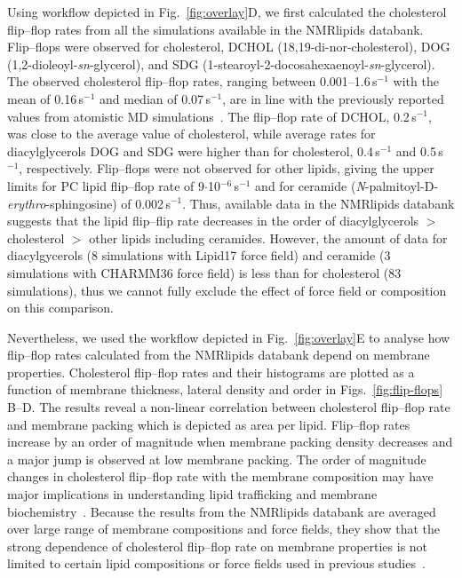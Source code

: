 \documentclass[fleqn,10pt]{wlscirep}
\begin{document}
Using workflow depicted in Fig.~\ref{fig:overlay}D, we first calculated the cholesterol flip--flop rates from all the simulations available in the NMRlipids databank. Flip--flops were observed for cholesterol, %
DCHOL (18,19-di-nor-cholesterol), %
DOG (1,2-dioleoyl-\textit{sn}-glycerol), %
and SDG (1-stearoyl-2-docosahexaenoyl-\textit{sn}-glycerol). The observed cholesterol flip--flop rates, ranging between 0.001--1.6\,\textmu{}s$^{-1}$ with the mean of 0.16\,\textmu{}s$^{-1}$ and median of 0.07\,\textmu{}s$^{-1}$, are in line with the previously reported values from atomistic MD simulations~\cite{gu19,javanainen19,baral20}. The flip--flop rate of DCHOL, 0.2\,\textmu{}s$^{-1}$, was close to the average value of cholesterol, while average rates for diacylglycerols DOG and SDG were higher than for cholesterol, 0.4\,\textmu{}s$^{-1}$ and 0.5\,\textmu{}s$^{-1}$, respectively. Flip--flops were not observed for other lipids, giving the upper limits for PC lipid flip--flop rate of 9$\cdot$10$^{-6}$\,\textmu{}s$^{-1}$ and for ceramide (\textit{N}-palmitoyl-\textsc{D}-\textit{erythro}-sphingosine) of 0.002\,\textmu{}s$^{-1}$. Thus, available data in the NMRlipids databank suggests that the lipid flip--flip rate decreases in the order of diacylglycerols $>$ cholesterol $>$ other lipids including ceramides. However, the amount of data for diacylgycerols (8 simulations with Lipid17 force field) and ceramide (3 simulations with CHARMM36 force field) is less than for cholesterol (83 simulations), thus we cannot fully exclude the effect of force field or composition on this comparison.

Nevertheless, we used the workflow depicted in Fig.~\ref{fig:overlay}E to analyse how flip--flop rates calculated from the NMRlipids databank depend on membrane properties. Cholesterol flip--flop rates and their histograms are plotted as a function of membrane thickness, lateral density and order in Figs.~\ref{fig:flip-flops} B--D. The results reveal a non-linear correlation between cholesterol flip--flop rate and membrane packing which is depicted as area per lipid. Flip--flop rates increase by an order of magnitude when membrane packing density decreases and a major jump is observed at low membrane packing. The order of magnitude changes in cholesterol flip--flop rate with the membrane composition may have major implications in understanding lipid trafficking and membrane biochemistry~\cite{gu19,baral20}. Because the results from the NMRlipids databank are averaged over large range of membrane compositions and force fields, they show that the strong dependence of cholesterol flip--flop rate on membrane properties is not limited to certain lipid compositions or force fields used in previous studies~\cite{gu19,javanainen19,baral20}.
\end{document}
